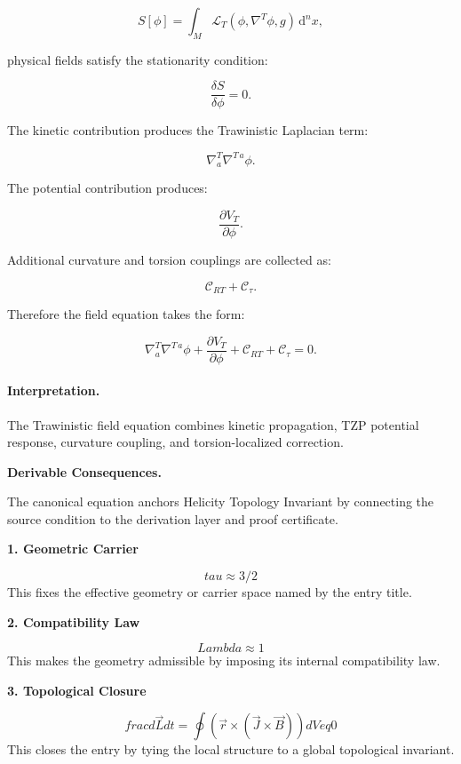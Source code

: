 \begin{equation}
S[\phi]
=
\int_M
\mathcal{L}_T
\left(
\phi,\nabla^T\phi,g
\right)
\,\mathrm{d}^n x ,
\end{equation}

physical fields satisfy the stationarity condition:

\begin{equation}
\frac{\delta S}{\delta\phi}=0 .
\end{equation}

The kinetic contribution produces the Trawinistic Laplacian term:

\begin{equation}
\nabla^T_a\nabla^{T\,a}\phi .
\end{equation}

The potential contribution produces:

\begin{equation}
\frac{\partial V_T}{\partial \phi}.
\end{equation}

Additional curvature and torsion couplings are collected as:

\begin{equation}
\mathcal{C}_{RT}
+
\mathcal{C}_{\tau}.
\end{equation}

Therefore the field equation takes the form:

\begin{equation}
\boxed{
\nabla^T_a\nabla^{T\,a}\phi
+
\frac{\partial V_T}{\partial \phi}
+
\mathcal{C}_{RT}
+
\mathcal{C}_{\tau}
=
0 .
}
\end{equation}

\paragraph{Interpretation.}
The Trawinistic field equation combines kinetic propagation, TZP potential response, curvature coupling, and torsion-localized correction.

\par\vspace{0.35em}
\noindent\textbf{Derivable Consequences.}\quad
\begingroup
\footnotesize
\raggedright
The canonical equation anchors Helicity Topology Invariant by connecting the source condition to the derivation layer and proof certificate.
\par\endgroup

\noindent\textbf{1. Geometric Carrier}\par
\[
tau \approx 3/2
\]
\noindent This fixes the effective geometry or carrier space named by the entry title.\par
\noindent\textbf{2. Compatibility Law}\par
\[
Lambda \approx 1
\]
\noindent This makes the geometry admissible by imposing its internal compatibility law.\par
\noindent\textbf{3. Topological Closure}\par
\[
frac{d\vec{L}}{dt} = \oint (\vec{r} \times (\vec{J} \times \vec{B})) dV  eq 0
\]
\noindent This closes the entry by tying the local structure to a global topological invariant.\par

